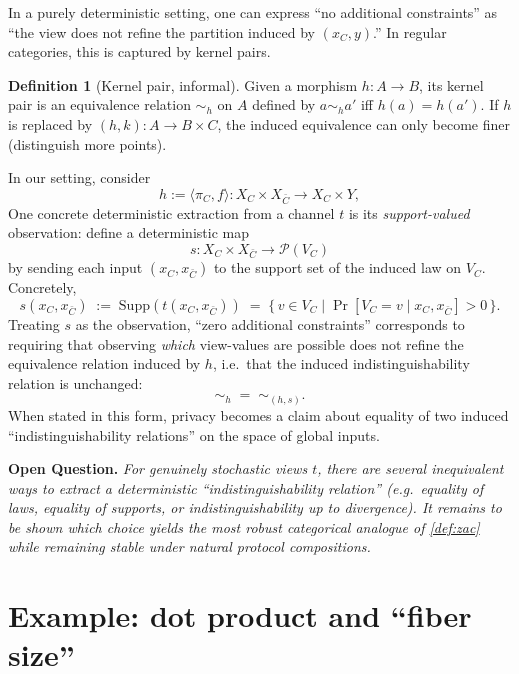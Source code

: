\documentclass[11pt,a4paper]{article}
\theoremstyle{definition}
\newtheorem{definition}[theorem]{Definition}
\theoremstyle{remark}
\newenvironment{openquestion}{\par\textbf{Open Question.}\itshape}{\par}
\begin{document}
In a purely deterministic setting, one can express ``no additional constraints'' as ``the view does not refine the partition induced by $(x_C,y)$.'' In regular categories, this is captured by kernel pairs.

\begin{definition}[Kernel pair, informal]
\label{def:kernel-pair-informal}
Given a morphism $h:A\to B$, its kernel pair is an equivalence relation $\sim_h$ on $A$ defined by $a\sim_h a'$ iff $h(a)=h(a')$. If $h$ is replaced by $(h,k):A\to B\times C$, the induced equivalence can only become finer (distinguish more points).
\end{definition}

In our setting, consider
\[
h := \langle \pi_C,f\rangle : X_C\times X_{\bar C}\to X_C\times Y,
\]
One concrete deterministic extraction from a channel $t$ is its \emph{support-valued} observation: define a deterministic map
\[
s : X_C\times X_{\bar C} \to \mathcal{P}(V_C)
\]
by sending each input $(x_C,x_{\bar C})$ to the support set of the induced law on $V_C$. Concretely,
\[
s(x_C,x_{\bar C}) \;:=\; \mathrm{Supp}(t(x_C,x_{\bar C})) \;=\; \{\,v\in V_C \mid \Pr[V_C=v\mid x_C,x_{\bar C}]>0\,\}.
\]
Treating $s$ as the observation, ``zero additional constraints'' corresponds to requiring that observing \emph{which} view-values are possible does not refine the equivalence relation induced by $h$, i.e.\ that the induced indistinguishability relation is unchanged:
\[
\sim_{h} \;=\; \sim_{(h,s)}.
\]
When stated in this form, privacy becomes a claim about equality of two induced ``indistinguishability relations'' on the space of global inputs.

\begin{openquestion}
\label{oq:kernel-pair-stochastic}
For genuinely stochastic views $t$, there are several inequivalent ways to extract a deterministic ``indistinguishability relation'' (e.g.\ equality of laws, equality of supports, or indistinguishability up to divergence). It remains to be shown which choice yields the most robust categorical analogue of \cref{def:zac} while remaining stable under natural protocol compositions.
\end{openquestion}

\section{Example: dot product and ``fiber size''}
\label{sec:dot-product}
\end{document}
